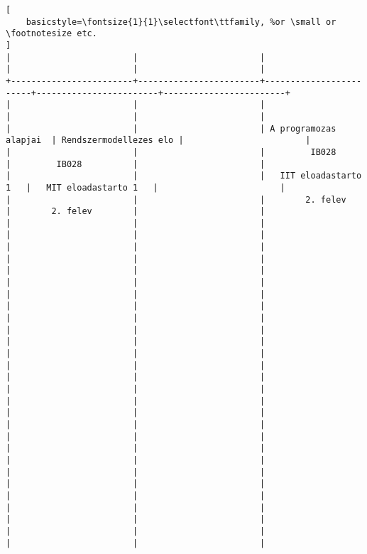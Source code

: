 \begin{lstlisting}[
    basicstyle=\fontsize{1}{1}\selectfont\ttfamily, %or \small or \footnotesize etc.
]
|                        |                        |                        |                        |                        | 
+------------------------+------------------------+------------------------+------------------------+------------------------+
|                        |                        |                        |                        |                        | 
|                        |                        | A programozas alapjai  | Rendszermodellezes elo |                        | 
|                        |                        |         IB028          |         IB028          |                        | 
|                        |                        |   IIT eloadastarto 1   |   MIT eloadastarto 1   |                        | 
|                        |                        |        2. felev        |        2. felev        |                        | 
|                        |                        |                        |                        |                        | 
|                        |                        |                        |                        |                        | 
|                        |                        |                        |                        |                        | 
|                        |                        |                        |                        |                        | 
|                        |                        |                        |                        |                        | 
|                        |                        |                        |                        |                        | 
|                        |                        |                        |                        |                        | 
|                        |                        |                        |                        |                        | 
|                        |                        |                        |                        |                        | 
|                        |                        |                        |                        |                        | 
|                        |                        |                        |                        |                        | 
|                        |                        |                        |                        |                        | 
|                        |                        |                        |                        |                        | 
|                        |                        |                        |                        |                        | 

\end{lstlisting}
